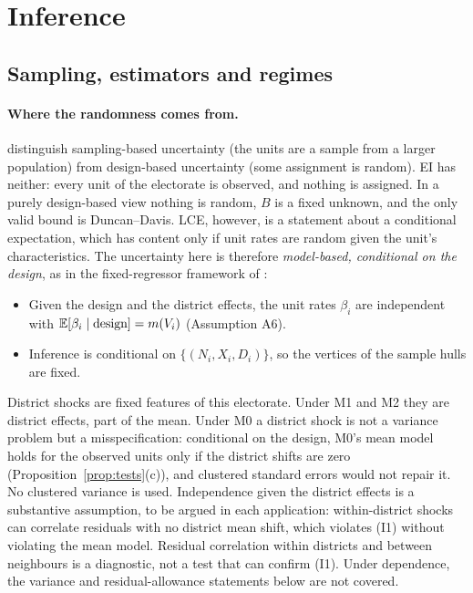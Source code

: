 \section{Inference}\label{sec:inference}

\subsection{Sampling, estimators and regimes}

\paragraph{Where the randomness comes from.} \citet{aaiw2023} distinguish
sampling-based uncertainty (the units are a sample from a larger population) from
design-based uncertainty (some assignment is random). EI has neither: every unit
of the electorate is observed, and nothing is assigned. In a purely design-based
view nothing is random, $B$ is a fixed unknown, and the only valid bound is
Duncan--Davis. LCE, however, is a statement about a conditional expectation,
which has content only if unit rates are random given the unit's
characteristics. The uncertainty here is therefore \emph{model-based, conditional
on the design}, as in the fixed-regressor framework of \citet{aiz2014}:
\begin{itemize}
\item[(I1)] Given the design and the district effects, the unit rates $\beta_i$ are
independent with $\mathbb E[\beta_i\mid\text{design}]=m(V_i)$ (Assumption A6).
\item[(I2)] Inference is conditional on $\{(N_i,X_i,D_i)\}$, so the vertices of
the sample hulls are fixed.
\end{itemize}
District shocks are fixed features of this electorate. Under M1 and M2 they are
district effects, part of the mean. Under M0 a district shock is not a variance
problem but a misspecification: conditional on the design, M0's mean model holds
for the observed units only if the district shifts are zero
(Proposition~\ref{prop:tests}(c)), and clustered standard errors would not
repair it. No clustered variance is used. Independence given the district
effects is a substantive assumption, to be argued in each application: within-district
shocks can correlate residuals with no district mean shift, which violates (I1)
without violating the mean model. Residual correlation within districts and
between neighbours is a diagnostic, not a test that can confirm (I1). Under
dependence, the variance and residual-allowance statements below are not
covered.


